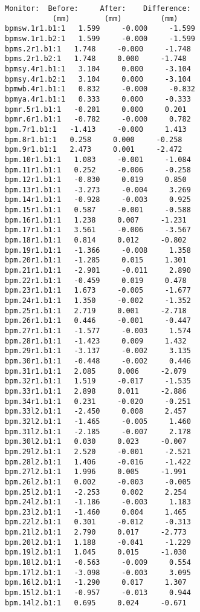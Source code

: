 \begin{verbatim}
Monitor:  Before:     After:    Difference:
           (mm)        (mm)         (mm)   
bpmsw.1r1.b1:1   1.599     -0.000     -1.599
bpmsw.1r1.b2:1   1.599     -0.000     -1.599
bpms.2r1.b1:1   1.748     -0.000     -1.748
bpms.2r1.b2:1   1.748     0.000     -1.748
bpmsy.4r1.b1:1   3.104     0.000     -3.104
bpmsy.4r1.b2:1   3.104     0.000     -3.104
bpmwb.4r1.b1:1   0.832     -0.000     -0.832
bpmya.4r1.b1:1   0.333     0.000     -0.333
bpmr.5r1.b1:1   -0.201     0.000     0.201
bpmr.6r1.b1:1   -0.782     -0.000     0.782
bpm.7r1.b1:1   -1.413     -0.000     1.413
bpm.8r1.b1:1   0.258     0.000     -0.258
bpm.9r1.b1:1   2.473     0.001     -2.472
bpm.10r1.b1:1   1.083     -0.001     -1.084
bpm.11r1.b1:1   0.252     -0.006     -0.258
bpm.12r1.b1:1   -0.830     0.019     0.850
bpm.13r1.b1:1   -3.273     -0.004     3.269
bpm.14r1.b1:1   -0.928     -0.003     0.925
bpm.15r1.b1:1   0.587     -0.001     -0.588
bpm.16r1.b1:1   1.238     0.007     -1.231
bpm.17r1.b1:1   3.561     -0.006     -3.567
bpm.18r1.b1:1   0.814     0.012     -0.802
bpm.19r1.b1:1   -1.366     -0.008     1.358
bpm.20r1.b1:1   -1.285     0.015     1.301
bpm.21r1.b1:1   -2.901     -0.011     2.890
bpm.22r1.b1:1   -0.459     0.019     0.478
bpm.23r1.b1:1   1.673     -0.005     -1.677
bpm.24r1.b1:1   1.350     -0.002     -1.352
bpm.25r1.b1:1   2.719     0.001     -2.718
bpm.26r1.b1:1   0.446     -0.001     -0.447
bpm.27r1.b1:1   -1.577     -0.003     1.574
bpm.28r1.b1:1   -1.423     0.009     1.432
bpm.29r1.b1:1   -3.137     -0.002     3.135
bpm.30r1.b1:1   -0.448     -0.002     0.446
bpm.31r1.b1:1   2.085     0.006     -2.079
bpm.32r1.b1:1   1.519     -0.017     -1.535
bpm.33r1.b1:1   2.898     0.011     -2.886
bpm.34r1.b1:1   0.231     -0.020     -0.251
bpm.33l2.b1:1   -2.450     0.008     2.457
bpm.32l2.b1:1   -1.465     -0.005     1.460
bpm.31l2.b1:1   -2.185     -0.007     2.178
bpm.30l2.b1:1   0.030     0.023     -0.007
bpm.29l2.b1:1   2.520     -0.001     -2.521
bpm.28l2.b1:1   1.406     -0.016     -1.422
bpm.27l2.b1:1   1.996     0.005     -1.991
bpm.26l2.b1:1   0.002     -0.003     -0.005
bpm.25l2.b1:1   -2.253     0.002     2.254
bpm.24l2.b1:1   -1.186     -0.003     1.183
bpm.23l2.b1:1   -1.460     0.004     1.465
bpm.22l2.b1:1   0.301     -0.012     -0.313
bpm.21l2.b1:1   2.790     0.017     -2.773
bpm.20l2.b1:1   1.188     -0.041     -1.229
bpm.19l2.b1:1   1.045     0.015     -1.030
bpm.18l2.b1:1   -0.563     -0.009     0.554
bpm.17l2.b1:1   -3.098     -0.003     3.095
bpm.16l2.b1:1   -1.290     0.017     1.307
bpm.15l2.b1:1   -0.957     -0.013     0.944
bpm.14l2.b1:1   0.695     0.024     -0.671

\end{verbatim}
